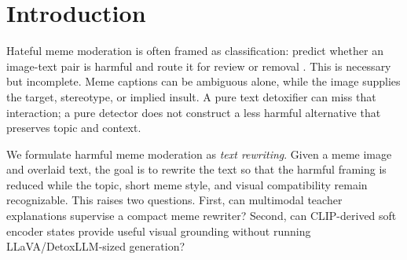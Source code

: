 \documentclass{article}
\newcommand{\sta}{\textsc{STA}}
\begin{document}


\begin{abstract}
Harmful memes often rely on image-text interactions to imply identity-based
attacks. We study meme text detoxification: given a meme image and caption,
generate a safer caption that preserves topic and image-text coherence. Our
system uses LLaVA-NeXT as a multimodal teacher to generate structured
explanations and pseudo-rewrites, then distills this behavior into a
LoRA-adapted BART-large student. We also test a CLIP Proxy + BART inference
path, where CLIP image/text features are mapped to BART encoder soft tokens,
avoiding LLaVA/DetoxLLM-sized generation at deployment. On 280 held-out memes,
the full BART student reaches $0.963\pm0.006$ Text \sta{} and
$0.207\pm0.006$ \sta{} delta across five seeds, numerically exceeding a
single-run text-only DetoxLLM-7B baseline on automatic toxicity metrics. The
proxy obtains the highest BERTScore and CLIPScore but lower Text \sta{},
indicating a fidelity-safety trade-off rather than stronger safety.\\
\textbf{Keywords:} meme detoxification, multimodal
learning, text rewriting, distillation, CLIP, BART.
\end{abstract}

\section{Introduction}
\label{sec:intro}

Hateful meme moderation is often framed as classification: predict whether an
image-text pair is harmful and route it for review or removal
\cite{kiela2020hateful,li2019visualbert}. This is necessary but incomplete.
Meme captions can be ambiguous alone, while the image supplies the target,
stereotype, or implied insult. A pure text detoxifier can miss that interaction;
a pure detector does not construct a less harmful alternative that preserves
topic and context.

We formulate harmful meme moderation as \emph{text rewriting}. Given a meme
image and overlaid text, the goal is to rewrite the text so that the harmful
framing is reduced while the topic, short meme style, and visual compatibility
remain recognizable. This raises two questions. First, can multimodal teacher
explanations supervise a compact meme rewriter? Second, can CLIP-derived soft
encoder states provide useful visual grounding without running
LLaVA/DetoxLLM-sized generation?
\end{document}
